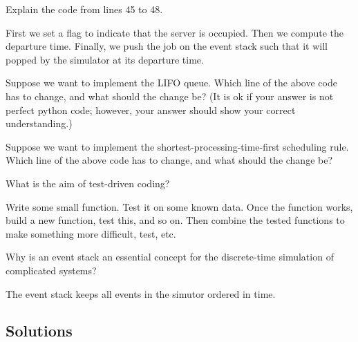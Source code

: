 \begin{exercise}[201907] Explain the code from lines 45 to 48.

\begin{solution}
  First we set a flag to indicate that the server is occupied.
  Then we compute the departure time.
  Finally, we push the job on the event stack such that it will popped by the simulator at its departure time.
\end{solution}
\end{exercise}              

\begin{exercise}[201907] Suppose we want to implement the LIFO queue. Which line of the above code has to change, and what should the change be? (It is ok if your answer is not perfect python code; however, your answer should show your correct understanding.) 

\begin{solution}
\end{solution}

\end{exercise}              

\begin{exercise}[201907] 
  Suppose we want to implement the shortest-processing-time-first scheduling rule.
  Which line of the above code has to change, and what should the change be?

\begin{solution}
\end{solution}
\end{exercise}              


\begin{exercise}[201907]
What is the aim of test-driven coding? 

\begin{solution}
  Write some small function.
  Test it on some known data.
  Once the function works, build a new function, test this, and so on.
  Then combine the tested functions to make something more difficult, test, etc.
\end{solution}
\end{exercise}

\begin{exercise}[201907]
  Why is an event stack an essential concept for the discrete-time simulation of complicated systems?

\begin{solution}
  The event stack keeps all events in the simutor ordered in time.
\end{solution}  
\end{exercise}

\subsection*{Solutions}




